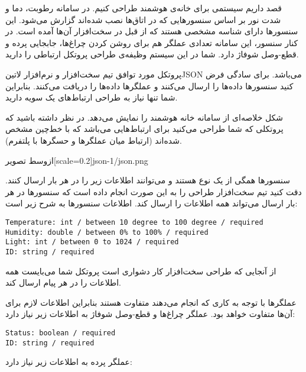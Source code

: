 
قصد داریم سیستمی برای خانه‌ی هوشمند طراحی کنیم.
در سامانه رطوبت، دما و شدت نور بر اساس سنسورهایی که در اتاق‌ها نصب شده‌اند گزارش می‌شود.
این سنسورها دارای شناسه مشخصی هستند که از قبل در سخت‌افزار آن‌ها آمده است.
در کنار سنسور، این سامانه تعدادی عملگر هم برای روشن کردن چراغ‌ها، جابجایی پرده و قطع-وصل شوفاژ دارد.
شما در این سیستم وظیفه‌ی طراحی پروتکل ارتباطی را دارید.

پروتکل مورد توافق تیم سخت‌افزار و نرم‌افزار ‌لاتین{JSON} می‌باشد. برای سادگی فرض کنید سنسورها داده‌ها را ارسال می‌کنند و عملگرها داده‌ها را دریافت می‌کنند.
بنابراین شما تنها نیاز به طراحی ارتباط‌های یک سویه دارید.

شکل  خلاصه‌ای از سامانه خانه هوشمند را نمایش می‌دهد. در نظر داشته باشید که پروتکلی که
شما طراحی می‌کنید برای ارتباط‌هایی می‌باشد که با خط‌چین مشخص شده‌اند (ارتباط میان عملگرها و حسگرها با پلتفرم).

  ‌ازوسط
  ‌تصویر[scale=0.2]{json-1/json.png}

سنسورها همگی از یک نوع هستند و می‌توانند اطلاعات زیر را در هر بار ارسال کنند.
دقت کنید تیم سخت‌افزار طراحی را به این صورت انجام داده است که سنسورها در هر بار ارسال می‌تواند همه اطلاعات را ارسال کند.
اطلاعات سنسورها به شرح زیر است:

\begin{latin}
\begin{verbatim}
Temperature: int / between 10 degree to 100 degree / required
Humidity: double / between 0% to 100% / required
Light: int / between 0 to 1024 / required
ID: string / required
\end{verbatim}
\end{latin}

از آنجایی که طراحی سخت‌افزار کار دشواری است پروتکل شما می‌بایست همه اطلاعات را در هر پیام ارسال کند.

عملگرها با توجه به کاری که انجام می‌دهند متفاوت هستند بنابراین اطلاعات لازم برای آن‌ها متفاوت خواهد بود.
عملگر چراغ‌ها و قطع-وصل شوفاژ به اطلاعات زیر نیاز دارد:

\begin{latin}
\begin{verbatim}
Status: boolean / required
ID: string / required
\end{verbatim}
\end{latin}

عملگر پرده به اطلاعات زیر نیاز دارد:

